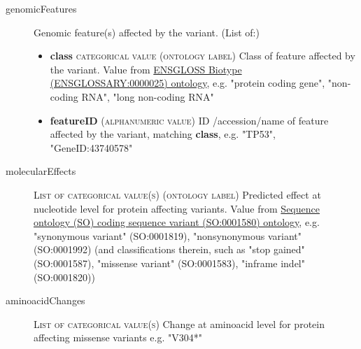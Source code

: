 \documentclass[a4paper, 10pt]{article}        %
\begin{document}
\begin{description}
	\item[genomicFeatures] Genomic feature(s) affected by the variant. (List of:)
	\begin{itemize}
			\item[]  \textbf{class} {\textsc{categorical value (ontology label)}} Class of feature affected by the variant. Value from \href{http://ensembl.org/glossary/ENSGLOSSARY_0000025}{ENSGLOSS Biotype (ENSGLOSSARY:0000025) ontology}, e.g. "protein coding gene", "non-coding RNA", "long non-coding RNA"
			\item[]  \textbf{featureID} {\textsc{(alphanumeric value)}} ID /accession/name of feature affected by the variant, matching \textbf{class}, e.g. "TP53", "GeneID:43740578"
	\end{itemize} 
	\item[molecularEffects] {\textsc{List of categorical value(s) (ontology label)}} Predicted effect at nucleotide level for protein affecting variants. Value from \href{http://purl.obolibrary.org/obo/SO_0001580}{Sequence ontology (SO) coding sequence variant (SO:0001580) ontology}, e.g. "synonymous variant" (SO:0001819), "nonsynonymous variant" (SO:0001992) (and classifications therein, such as "stop gained" (SO:0001587), "missense variant" (SO:0001583), "inframe indel" (SO:0001820))
	\item[aminoacidChanges]  {\textsc{List of categorical value(s)}} Change at aminoacid level for protein affecting missense variants e.g. "V304*"
	
 \end{description}



\end{document}
